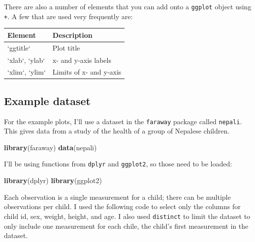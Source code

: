 \documentclass[]{book}
\makeatletter
\newenvironment{Shaded}{\begin{snugshade}}{\end{snugshade}}
\newcommand{\KeywordTok}[1]{\textcolor[rgb]{0.13,0.29,0.53}{\textbf{#1}}}
\newcommand{\DataTypeTok}[1]{\textcolor[rgb]{0.13,0.29,0.53}{#1}}
\newcommand{\DecValTok}[1]{\textcolor[rgb]{0.00,0.00,0.81}{#1}}
\newcommand{\StringTok}[1]{\textcolor[rgb]{0.31,0.60,0.02}{#1}}
\newcommand{\OtherTok}[1]{\textcolor[rgb]{0.56,0.35,0.01}{#1}}
\newcommand{\OperatorTok}[1]{\textcolor[rgb]{0.81,0.36,0.00}{\textbf{#1}}}
\newcommand{\NormalTok}[1]{#1}
\newenvironment{kframe}{%
\medskip{}
\setlength{\fboxsep}{.8em}
 \def\at@end@of@kframe{}%
 \ifinner\ifhmode%
  \def\at@end@of@kframe{\end{minipage}}%
  \begin{minipage}{\columnwidth}%
 \fi\fi%
 \def\FrameCommand##1{\hskip\@totalleftmargin \hskip-\fboxsep
 \colorbox{shadecolor}{##1}\hskip-\fboxsep
     \hskip-\linewidth \hskip-\@totalleftmargin \hskip\columnwidth}%
 \MakeFramed {\advance\hsize-\width
   \@totalleftmargin\z@ \linewidth\hsize
   \@setminipage}}%
 {\par\unskip\endMakeFramed%
 \at@end@of@kframe}
\renewenvironment{Shaded}{\begin{kframe}}{\end{kframe}}
\theoremstyle{definition}
\theoremstyle{definition}
\theoremstyle{definition}
\theoremstyle{remark}
\makeatother
\begin{document}
There are also a number of elements that you can add onto a
\texttt{ggplot} object using \texttt{+}. A few that are used very
frequently are:

\begin{tabular}{l|l}
\hline
Element & Description\\
\hline
`ggtitle` & Plot title\\
\hline
`xlab`, `ylab` & x- and y-axis labels\\
\hline
`xlim`, `ylim` & Limits of x- and y-axis\\
\hline
\end{tabular}

\subsection{Example dataset}\label{example-dataset}

For the example plots, I'll use a dataset in the \texttt{faraway}
package called \texttt{nepali}. This gives data from a study of the
health of a group of Nepalese children.

\begin{Shaded}
\begin{Highlighting}[]
\KeywordTok{library}\NormalTok{(faraway)}
\KeywordTok{data}\NormalTok{(nepali)}
\end{Highlighting}
\end{Shaded}

I'll be using functions from \texttt{dplyr} and \texttt{ggplot2}, so
those need to be loaded:

\begin{Shaded}
\begin{Highlighting}[]
\KeywordTok{library}\NormalTok{(dplyr)}
\KeywordTok{library}\NormalTok{(ggplot2)}
\end{Highlighting}
\end{Shaded}

Each observation is a single measurement for a child; there can be
multiple observations per child. I used the following code to select
only the columns for child id, sex, weight, height, and age. I also used
\texttt{distinct} to limit the dataset to only include one measurement
for each chile, the child's first measurement in the dataset.

\begin{Shaded}
\end{Shaded}
\end{document}
